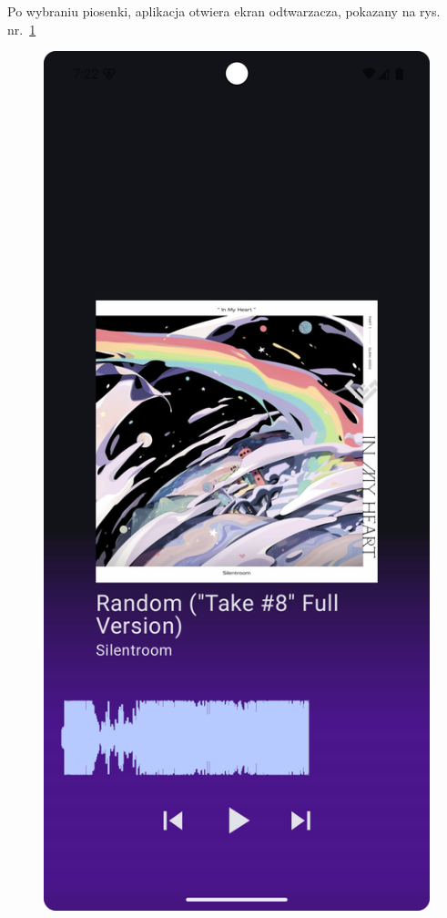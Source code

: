 Po wybraniu piosenki, aplikacja otwiera ekran odtwarzacza, pokazany na rys. nr.~\ref{fig:tutorial_player_view}

\begin{figure}[H]
	\centering
	\includegraphics[width=1\textwidth]{images/tutorial_player_view.png}
	\caption{}
	\label{fig:tutorial_player_view}
\end{figure}

